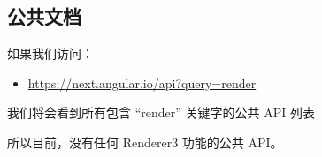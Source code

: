 \subsection{公共文档}


如果我们访问：

\begin{itemize}
  \item \url{https://next.angular.io/api?query=render}
\end{itemize}


我们将会看到所有包含 “render” 关键字的公共 API 列表


所以目前，没有任何 Renderer3 功能的公共 API。
